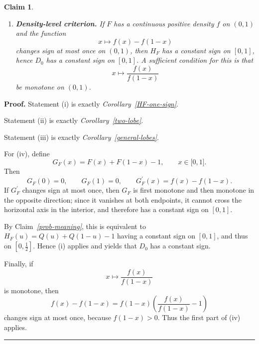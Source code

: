 \documentclass[onecolumn]{article}
\newtheorem{claim}[theorem]{Claim}
\newenvironment{proof}[1][Proof]{\noindent\textbf{#1.} }{\ \rule{0.5em}{0.5em}}
\begin{document}
\begin{claim}
\begin{enumerate}
\item \textbf{Density-level criterion.} If $F$ has a continuous positive
density $f$ on $(0,1)$ and the function 
\begin{equation}
x\mapsto f(x)-f(1-x)  \label{1387}
\end{equation}%
changes sign at most once on $(0,1)$, then $H_{F}$ has a constant sign on $%
[0,1]$, hence $D_{0}$ has a constant sign on $[0,1]$. A sufficient condition
for this is that 
\begin{equation}
x\longmapsto \frac{f(x)}{f(1-x)}  \label{1388}
\end{equation}%
be monotone on $(0,1)$.
\end{enumerate}
\end{claim}

\begin{proof}
Statement \textup{(i)} is exactly \textit{Corollary~\ref{HF-one-sign}}.

Statement \textup{(ii)} is exactly \textit{Corollary~\ref{two-lobe}}.

Statement \textup{(iii)} is exactly \textit{Corollary~\ref{general-lobes}}.

For \textup{(iv)}, define 
\begin{equation}
G_{F}(x)=F(x)+F(1-x)-1,\qquad x\in \lbrack 0,1].  \label{1389}
\end{equation}%
Then 
\begin{equation}
G_{F}(0)=0,\qquad G_{F}(1)=0,\qquad G_{F}^{\prime }(x)=f(x)-f(1-x).
\label{1390}
\end{equation}%
If $G_{F}^{\prime }$ changes sign at most once, then $G_{F}$ is first
monotone and then monotone in the opposite direction; since it vanishes at
both endpoints, it cannot cross the horizontal axis in the interior, and
therefore has a constant sign on $[0,1]$.

By Claim\textit{~\ref{prob-meaning}}, this is equivalent to $%
H_{F}(u)=Q(u)+Q(1-u)-1$ having a constant sign on $[0,1]$, and thus on $[0,%
\tfrac{1}{2}]$. Hence \textup{(i)} applies and yields that $D_{0}$ has a
constant sign.

Finally, if 
\begin{equation}
x\longmapsto \frac{f(x)}{f(1-x)}  \label{1391}
\end{equation}%
is monotone, then 
\begin{equation}
f(x)-f(1-x)=f(1-x)\left( \frac{f(x)}{f(1-x)}-1\right)  \label{1392}
\end{equation}%
changes sign at most once, because $f(1-x)>0$. Thus the first part of 
\textup{(iv)} applies. \hfill
\end{proof}
\end{document}
